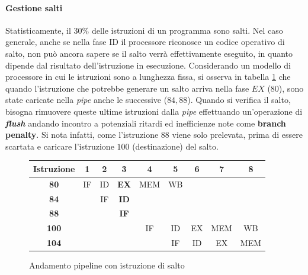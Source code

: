 \documentclass{article}
\begin{document}
\paragraph{Gestione salti}

Statisticamente, il 30\% delle istruzioni di un programma sono salti. Nel caso 
generale, anche se nella fase ID il processore riconosce un codice operativo di
salto, non può ancora sapere se il salto verrà effettivamente eseguito, in 
quanto dipende dal risultato dell'istruzione in esecuzione. Considerando 
un modello di processore in cui le istruzioni sono a lunghezza fissa, si 
osserva in tabella \ref{tab:branch_penalty} che quando l'istruzione che 
potrebbe generare un salto arriva nella fase $EX$ ($80$), sono state caricate
nella \textit{pipe} anche le successive ($84,88$). Quando si verifica il salto,
bisogna rimuovere queste  ultime istruzioni dalla \textit{pipe} effettuando 
un'operazione di \textit{\textbf{flush}} andando incontro a potenziali ritardi 
ed inefficienze note come  \textbf{branch penalty}. Si nota infatti, come
l'istruzione $88$ viene solo  prelevata, prima di essere scartata e caricare
l'istruzione $100$ (destinazione) del salto.

\begin{figure}
\begin{center}
  \begin{tabular}{|c|c|c|c|c|c|c|c|c|}
    \hline
    \textbf{Istruzione} & \textbf{1} & \textbf{2} & \textbf{3} & \textbf{4} & 
    \textbf{5} & \textbf{6} & \textbf{7}& \textbf{8}\\
    \hline
    \textbf{80} & IF & ID & \textbf{EX} & MEM & WB & & &\\
    \textbf{84} &  & IF & \textbf{ID} & & & & & \\
    \textbf{88} &  &  & \textbf{IF} &  & & & & \\
    \textbf{100} &  &  &  & IF & ID & EX & MEM & WB \\
    \textbf{104} &  &  &  &  & IF & ID & EX & MEM \\
    \hline
  \end{tabular}
  \caption{Andamento pipeline con istruzione di salto}
  \label{tab:branch_penalty}
\end{center}
\end{figure}
\end{document}
